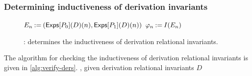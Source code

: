 \subsubsection{Determining inductiveness of derivation invariants}
\label{sec:chk-ind}
\begin{figure}
  \centering
  \begin{algorithm}[H]
    {  %
      { %
        $E_n \assign %
        (\dersexps{P_0}{D}(n), \dersexps{P_1}{D}(n))$ %
        \label{line:bind-exps} \;
        $\varphi_n \mathbin{:=} I(E_n)$ \label{line:bind-invs} \;
         {
          \Return{$\isind$} } %
      \label{line:chkind-aux-end} } %
    \label{line:chkind-base} } %
    \caption{%
      \chkinductive: determines the inductiveness of derivation
      relational invariants. }
    \label{alg:chk-ind}
  \end{algorithm}
\end{figure}
%
The algorithm \chkinductive for checking the inductiveness of
derivation relational invariants is given in
\autoref{alg:verify-ders}.
%
\chkinductive, given derivation relational invariants $D$
